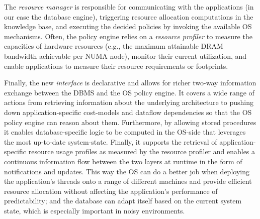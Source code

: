 \documentclass[11pt]{article}
\begin{document}
The \textit{resource manager} is responsible for communicating with the applications (in our 
case the database engine), triggering resource allocation computations in the knowledge base,
and executing the decided policies by invoking the available OS mechanisms. 
Often, the policy engine relies on a \textit{resource profiler} to measure the capacities 
of hardware resources (e.g., the maximum attainable DRAM bandwidth achievable per NUMA node), 
monitor their current utilization, and enable applications to measure their resource 
requirements or footprints.

Finally, the new {\it interface} is declarative and allows for richer two-way information exchange 
between the DBMS and the OS policy engine. It covers a wide range of actions from retrieving 
information about the underlying architecture to pushing down application-specific cost-models
and dataflow dependencies so that the OS policy engine can reason about them. Furthermore,
by allowing stored procedures it enables database-specific logic to be computed in 
the OS-side that leverages the most up-to-date system-state. Finally, it supports the 
retrieval of application-specific resource usage profiles as measured by the resource 
profiler and enables a continuous information flow between the two layers at runtime
in the form of notifications and updates. This way the OS can do a better job when 
deploying the application's threads onto a range of different machines and provide 
efficient resource allocation without affecting the application's performance of 
predictability; and the database can adapt itself based on the current system state,
which is especially important in noisy environments. 
\end{document}
